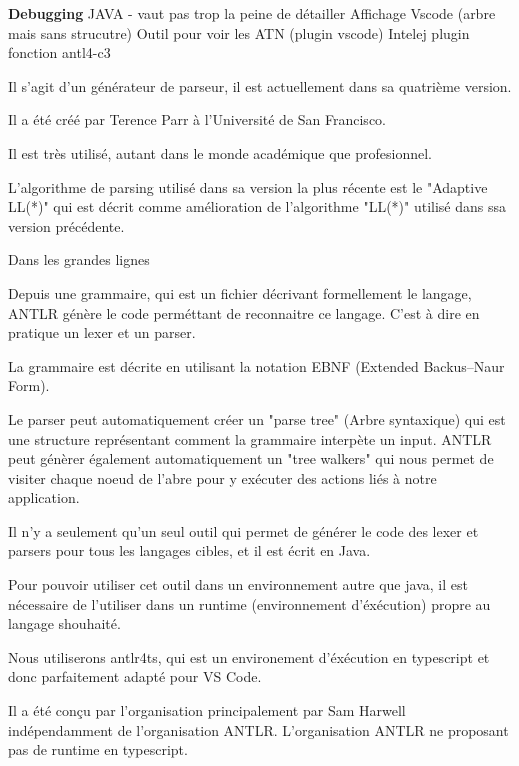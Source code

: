\documentclass[
    iict, %
    il, %
]{heig-tb}
\begin{document}
\textbf{Debugging}
JAVA - vaut pas trop la peine de détailler
Affichage Vscode (arbre mais sans strucutre)
Outil pour voir les ATN (plugin vscode)
Intelej plugin
fonction antl4-c3


Il s'agit d'un générateur de parseur, il est actuellement dans sa quatrième version.

Il a été créé par Terence Parr à l'Université de San Francisco.

Il est très utilisé, autant dans le monde académique que profesionnel.

L'algorithme de parsing utilisé dans sa version la plus récente est le "Adaptive LL(*)" qui est décrit comme amélioration de l'algorithme
"LL(*)" utilisé dans ssa version précédente.


Dans les grandes lignes  %

Depuis une grammaire, qui est un fichier décrivant formellement le langage, ANTLR génère le code perméttant de reconnaitre ce langage.
C'est à dire en pratique un lexer et un parser.

La grammaire est décrite en utilisant la notation EBNF (Extended Backus–Naur Form).

Le parser peut automatiquement créer un "parse tree" (Arbre syntaxique) qui est une structure représentant comment la grammaire interpète un input.
ANTLR peut génèrer également automatiquement un "tree walkers" qui nous permet de visiter chaque noeud de l'abre pour y exécuter des actions liés à notre application.

Il n'y a seulement qu'un seul outil qui permet de générer le code des lexer et parsers pour tous les langages cibles, et il est écrit en Java.

Pour pouvoir utiliser cet outil dans un environnement autre que java, il est nécessaire de l'utiliser dans un runtime (environnement d'éxécution) propre au langage shouhaité.


Nous utiliserons antlr4ts, qui est un environement d'éxécution en typescript et donc parfaitement adapté pour VS Code.

Il a été conçu par l'organisation principalement par Sam Harwell indépendamment de l'organisation ANTLR.
L'organisation ANTLR ne proposant pas de runtime en typescript. %
\end{document}
